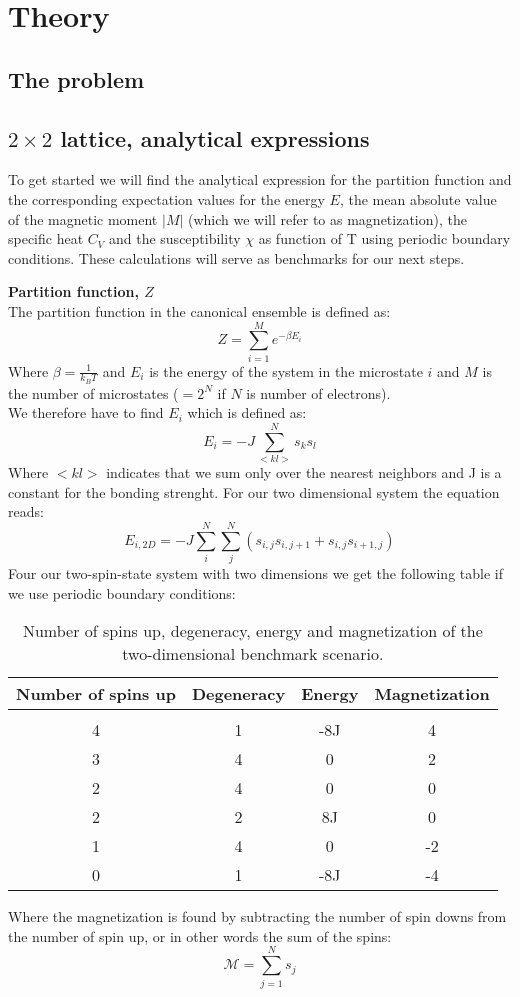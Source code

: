 \documentclass[../main.tex]{subfiles}
\begin{document}
  \section{Theory}
  \subsection{The problem}
  \subsection{$2 \times 2$ lattice, analytical expressions}
    To get started we will find the analytical expression for the partition function and the corresponding expectation values for the energy $E$, the mean absolute value of the magnetic moment $|M|$ (which we will refer to as magnetization), the specific heat $C_V$ and the susceptibility $\chi$ as function of T using periodic boundary conditions. These calculations will serve as benchmarks for our next steps.

    \textbf{Partition function, $Z$}\\
    The partition function in the canonical ensemble is defined as:
    \[ Z = \sum_{i=1}^M e^{-\beta E_i}\]
    Where $\beta =\frac{1}{k_B T}$ and $E_i$ is the energy of the system in the microstate $i$ and $M$ is the number of microstates ($=2^N$ if $N$ is number of electrons).
    \\
    We therefore have to find $E_i$ which is defined as:
    \[E_i = -J \sum_{<kl>}^N s_k s_l\]
    Where $<kl>$ indicates that we sum only over the nearest neighbors and J is a constant for the bonding strenght. For our two dimensional system the equation reads:
    \[E_{i,2D} = -J \sum_i^N \sum_j^N \left(s_{i,j}s_{i,j+1} + s_{i,j}s_{i+1,j}\right)\]
    Four our two-spin-state system with two dimensions we get the following table if we use periodic boundary conditions:
    \begin{table}[!h]
    \begin{center}
      \begin{tabular}{c c c c}
        Number of spins up & Degeneracy & Energy & Magnetization\\
        \hline\\
        4 & 1 & -8J & 4\\
        3 & 4 & 0 & 2 \\
        2 & 4 & 0 & 0\\
        2 & 2 & 8J & 0 \\
        1 & 4 & 0 & -2 \\
        0 & 1 & -8J & -4
      \end{tabular}
      \caption{Number of spins up, degeneracy, energy and magnetization of the two-dimensional benchmark scenario.}
      \label{tab:2x2spinsEnergiesMags}
    \end{center}
    \end{table}
    \FloatBarrier
    Where the magnetization is found by subtracting the number of spin downs from the number of spin up, or in other words the sum of the spins:
    \[\mathcal{M} = \sum_{j=1}^N s_j\]
\end{document}
